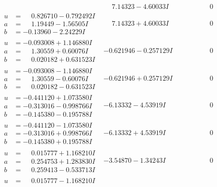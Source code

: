 \documentclass[1p]{elsarticle_modified}
\theoremstyle{definition}
\begin{document}
$$\begin{array}{c|c|c}
 & \phantom{-}7.14323 - 4.60033 I & \phantom{-0.000000 } 0 \\ \hline\begin{aligned}
u &= \phantom{-}0.826710 - 0.792492 I \\
a &= \phantom{-}1.19449 - 1.56505 I \\
b &= -0.13960 - 2.24229 I\end{aligned}
 & \phantom{-}7.14323 + 4.60033 I & \phantom{-0.000000 } 0 \\ \hline\begin{aligned}
u &= -0.093008 + 1.146880 I \\
a &= \phantom{-}1.30559 + 0.60076 I \\
b &= \phantom{-}0.020182 + 0.631523 I\end{aligned}
 & -0.621946 - 0.257129 I & \phantom{-0.000000 } 0 \\ \hline\begin{aligned}
u &= -0.093008 - 1.146880 I \\
a &= \phantom{-}1.30559 - 0.60076 I \\
b &= \phantom{-}0.020182 - 0.631523 I\end{aligned}
 & -0.621946 + 0.257129 I & \phantom{-0.000000 } 0 \\ \hline\begin{aligned}
u &= -0.441120 + 1.073580 I \\
a &= -0.313016 - 0.998766 I \\
b &= -0.145380 - 0.195788 I\end{aligned}
 & -6.13332 - 4.53919 I & \phantom{-0.000000 } 0 \\ \hline\begin{aligned}
u &= -0.441120 - 1.073580 I \\
a &= -0.313016 + 0.998766 I \\
b &= -0.145380 + 0.195788 I\end{aligned}
 & -6.13332 + 4.53919 I & \phantom{-0.000000 } 0 \\ \hline\begin{aligned}
u &= \phantom{-}0.015777 + 1.168210 I \\
a &= \phantom{-}0.254753 + 1.283830 I \\
b &= \phantom{-}0.259413 - 0.533713 I\end{aligned}
 & -3.54870 - 1.34243 I & \phantom{-0.000000 } 0 \\ \hline\begin{aligned}
u &= \phantom{-}0.015777 - 1.168210 I \\

\end{aligned}
\end{array}$$
\end{document}
